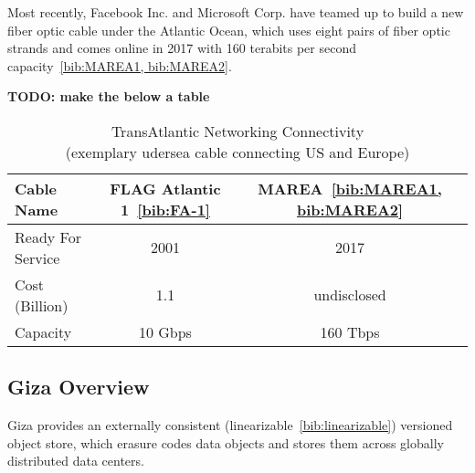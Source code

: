 
Most recently, Facebook Inc. and Microsoft Corp. have teamed up to build a new fiber optic cable under the Atlantic Ocean, which uses eight pairs of fiber optic strands and comes online in 2017 with 160 terabits per second capacity~\ref{bib:MAREA1, bib:MAREA2}.

{\bf TODO: make the below a table}

\begin{table}[thp]
\centering
\begin{tabular}{|l|c|c|}
\hline
Cable Name                      & FLAG Atlantic 1~\ref{bib:FA-1}    & MAREA~\ref{bib:MAREA1, bib:MAREA2}
\\ \hline \hline
Ready For Service               & 2001                              & 2017
\\ \hline
Cost (Billion)                  & 1.1                               & undisclosed
\\ \hline
Capacity                        & 10 Gbps                           & 160 Tbps
\\ \hline \hline
\end{tabular}
\caption{TransAtlantic Networking Connectivity \\ (exemplary udersea cable connecting US and Europe)}
\label{tab:mears}
\end{table}


\subsection{Giza Overview}

Giza provides an externally consistent (linearizable~\ref{bib:linearizable}) versioned object store, which erasure codes data objects and stores them across globally distributed data centers.

